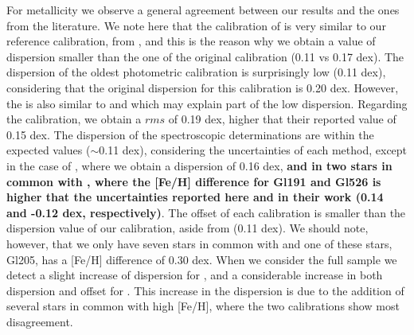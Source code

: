 \documentclass[referee]{aa}
\begin{document}
For metallicity we observe a general agreement between our results and the ones from the literature. We note here that the calibration of \citet{Schlaufman-2010} is very similar to our reference calibration, from \citet{Neves-2012}, and this is the reason why we obtain a value of dispersion smaller than the one of the original calibration (0.11 vs 0.17 dex). The dispersion of the oldest photometric calibration \citep{Bonfils-2005} is surprisingly low (0.11 dex), considering that the original dispersion for this calibration is 0.20 dex. However, the \citet{Bonfils-2005} is also similar to \citet{Schlaufman-2010} and \citet{Neves-2012} which may explain part of the low dispersion. Regarding the \citet{Johnson-2012} calibration, we obtain a $rms$ of 0.19 dex, higher that their reported value of 0.15 dex. The dispersion of the spectroscopic determinations are within the expected values ($\sim$0.11 dex), considering the uncertainties of each method, except in the case of \citet{Mann-2013b}, where we obtain a dispersion of 0.16 dex, \textbf{and in two stars in common with \citet{Woolf-2005}, where the [Fe/H] difference for Gl191 and Gl526 is higher that the uncertainties reported here and in their work (0.14 and -0.12 dex, respectively)}. The offset of each calibration is smaller than the dispersion value of our calibration, aside from \citet{Mann-2013b} (0.11 dex). We should note, however, that we only have seven stars in common with \citet{Mann-2013b} and one of these stars, Gl205, has a [Fe/H] difference of 0.30 dex. When we consider the full sample we detect a slight increase of dispersion for \citet{Rojas-Ayala-2012}, and a considerable increase in both dispersion and offset for \citet{Newton-2013}. This increase in the \citet{Newton-2013} dispersion is due to the addition of several stars in common with high [Fe/H], where the two calibrations show most disagreement.  %
\end{document}
